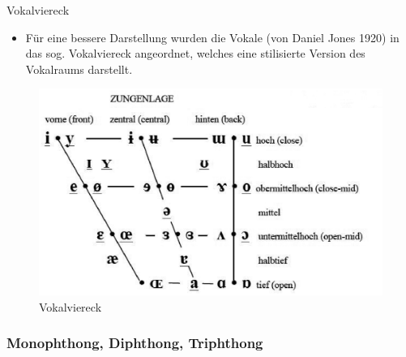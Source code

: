 \begin{frame}{Vokalviereck}

	\begin{itemize}
		\item Für eine bessere Darstellung wurden die Vokale (von Daniel Jones 1920) in das sog. Vokalviereck angeordnet, welches eine stilisierte Version des Vokalraums darstellt.
	\end{itemize}

	\begin{figure}[H]
		\centering
		
		\includegraphics[scale=0.45]{material/04ipatabellerepp11vokalviereck}
		\caption{Vokalviereck \citep{Repp&Co12a}}
	\end{figure}	
	
\end{frame}


%
\subsubsection{Monophthong, Diphthong, Triphthong}


